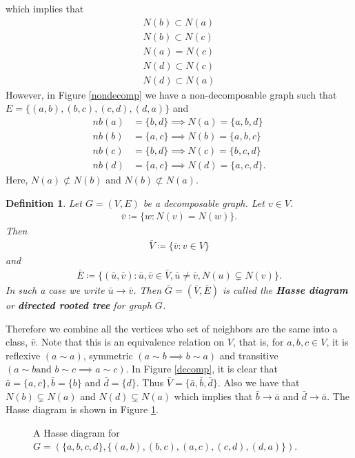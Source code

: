 \documentclass[12pt, leqno]{article}
\newtheorem{defn}[thm]{Definition}
\begin{document}
which implies that
\begin{align*}
N(b) \subset N(a)  \\
N(b) \subset N(c)  \\
N(a) = N(c)  \\
N(d) \subset N(c)  \\
N(d) \subset N(a) 
\end{align*} 
However, in Figure \ref{nondecomp} we have a non-decomposable graph such that $E =
\{(a,b),(b,c),(c,d),(d,a)\}$ and 
\begin{align*}
nb(a) &= \{b,d\} \implies N(a)  = \{a,b,d\}\\
nb(b) &= \{a,c\} \implies N(b)  = \{a,b,c\}\\
nb(c) &= \{b,d\} \implies N(c)  = \{b,c,d\}\\
nb(d) &= \{a,c\} \implies N(d)  = \{a,c,d\}.
\end{align*}
Here, $N(a) \not\subset N(b)$ and $N(b)
\not\subset  N(a)$. 
\begin{defn}
Let $G = (V,E)$ be a decomposable graph. Let $v \in V$.
\begin{align*}
\bar{v} \coloneqq \{w: N(v) = N(w)\}.
\end{align*}
Then
\begin{align*}
\bar{V} \coloneqq \{\bar{v}:v \in V\}
\end{align*}
and 
\begin{align*}
\bar{E} \coloneqq \{(\bar{u},\bar{v}): \bar{u}, \bar{v} \in \bar{V},
  \bar{u} \not= \bar{v}, N(u) \subsetneq N(v) \}.
\end{align*}
In such a case we write $\bar{u} \to \bar{v}$.
Then $\bar{G} = (\bar{V}, \bar{E})$ is called the \textbf{Hasse
  diagram} or \textbf{directed rooted tree} for graph $G$. 
\end{defn}
Therefore we combine all the vertices who set of neighbors are the
same into a class, $\bar{v}$. Note that this is an equivalence
relation on $V$, that is, for $a,b,c \in V$, it is reflexive $(a \sim a)$, symmetric $(a \sim b
\implies b \sim a)$ and transitive $(a \sim b \text{
  and } b \sim c \implies
a \sim c)$. In Figure \ref{decomp}, it is clear that $\bar{a} =
\{a,c\}, \bar{b} =
\{b\}$ and $\bar{d} = \{d\}$. Thus $\bar{V} =
\{\bar{a},\bar{b},\bar{d} \}$. Also we have that $N(b) \subsetneq N(a) $
and $N(d) \subsetneq N(a)$ which implies that $\bar{b} \to \bar{a}$
and $\bar{d} \to \bar{a}$. The Hasse diagram is shown in Figure
\ref{hasseg}.
\begin{figure}
\begin{center}
\caption{A Hasse diagram for $G = ( \{a,b,c,d\} , \{(a,b),(b,c),(a,c),(c,d),(d,a)\}).$}
\label{hasseg}
\end{center}
\end{figure} 
\end{document}
